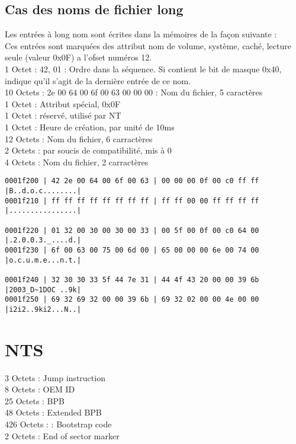 \documentclass[11pt]{report}
\begin{document}
\section{Cas des noms de fichier long}
Les entrées à long nom sont écrites dans la mémoires de la façon suivante : \\
Ces entrées sont marquées des attribut nom de volume, système, caché, lecture seule (valeur 0x0F) a l'ofset numéros 12.\\
1 Octet : 42, 01 : Ordre dans la séquence. Si contient le bit de masque 0x40, indique qu'il s'agit de la dernière entrée de ce nom. \\
10 Octets : 2e 00 64 00 6f 00 63 00 00 00 : Nom du fichier, 5 caractères\\
1 Octet : Attribut spécial, 0x0F\\
1 Octet : réservé, utilisé par NT\\
1 Octet : Heure de création, par unité de 10ms\\
12 Octets : Nom du fichier, 6 carractères\\
2 Octets : par soucis de compatibilité, mis à 0 \\
4 Octets : Nom du fichier, 2 carractères\\
\begin{verbatim}
0001f200 | 42 2e 00 64 00 6f 00 63 | 00 00 00 0f 00 c0 ff ff    |B..d.o.c........|
0001f210 | ff ff ff ff ff ff ff ff | ff ff 00 00 ff ff ff ff    |................|

0001f220 | 01 32 00 30 00 30 00 33 | 00 5f 00 0f 00 c0 64 00    |.2.0.0.3._....d.|
0001f230 | 6f 00 63 00 75 00 6d 00 | 65 00 00 00 6e 00 74 00    |o.c.u.m.e...n.t.|

0001f240 | 32 30 30 33 5f 44 7e 31 | 44 4f 43 20 00 00 39 6b    |2003_D~1DOC ..9k|
0001f250 | 69 32 69 32 00 00 39 6b | 69 32 02 00 00 4e 00 00    |i2i2..9ki2...N..|
\end{verbatim}
\chapter{NTS}

3 Octets :  Jump instruction\\
8 Octets : OEM ID\\
25 Octets : BPB\\
48 Octets : Extended BPB\\
426 Octets : : Bootstrap code\\
2 Octets : End of sector marker\\
\end{document}
